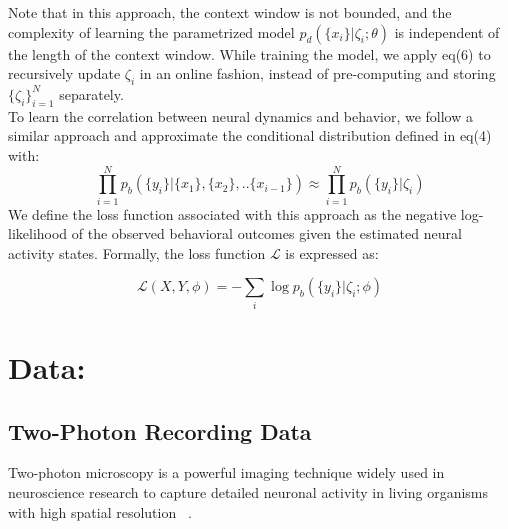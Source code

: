 \documentclass[12pt]{article}
\begin{document}
Note that in this approach, the context window is not bounded, and the complexity of learning the parametrized model $p_d(\{x_{i}\}|\zeta_i;\theta)$ is independent of the length of the context window. While training the model, we apply eq(6) to recursively update $\zeta_i$ in an online fashion, instead of pre-computing and storing $\{\zeta_i\}_{i=1}^N$ separately.
 \\

 To learn the correlation between neural dynamics and behavior, we follow a similar approach and approximate the conditional distribution defined in eq(4) with:
\\
 \begin{equation}
   \prod_{i=1}^{N} p_b(\{y_{i}\}| \{x_1\},\{x_2\},..\{x_{i-1}\}) 
   \approx  \prod_{i=1}^{N} p_b(\{y_{i}\}|\zeta_i)
\end{equation}
We define the loss function associated with this approach as the negative log-likelihood of the observed behavioral outcomes given the estimated neural activity states. Formally, the loss function \( \mathcal{L} \) is expressed as:

\[
\mathcal{L}(X,Y,\phi) = -\sum_{i} \log p_b(\{y_i\}|\zeta_i;\phi)
\]



\section{Data:}
\subsection{ Two-Photon Recording Data}
Two-photon microscopy is a powerful imaging technique widely used in neuroscience research to capture detailed neuronal activity in living organisms with high spatial resolution ~\cite{svoboda2006principles}.\\
\end{document}

